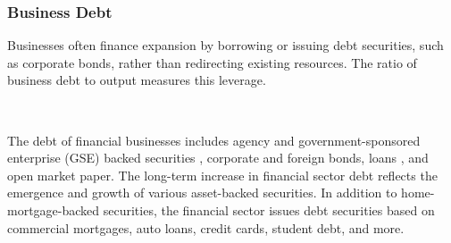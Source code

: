 \subsubsection*{Business Debt}
\begin{minipage}{0.76\textwidth}  
\small Businesses often finance expansion by borrowing or issuing debt securities, such as corporate bonds, rather than redirecting existing resources. The ratio of business debt to output measures this leverage. 

 
\vspace{1mm}

\busdebtgdp
{}\\
\vspace{4mm}

\small The debt of financial businesses includes agency and government-sponsored enterprise (GSE) backed securities , corporate and foreign bonds, loans , and open market paper. The long-term increase in financial sector debt reflects the emergence and growth of various asset-backed securities. In addition to home-mortgage-backed securities, the financial sector issues debt securities based on commercial mortgages, auto loans, credit cards, student debt, and more. 

 
\vspace{1mm}


\end{minipage}
